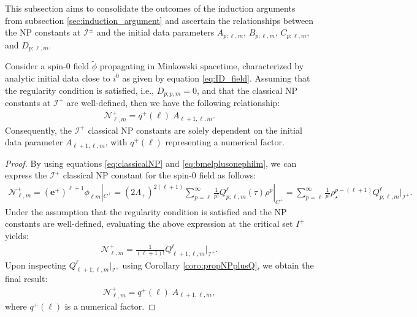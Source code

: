 This subsection aims to consolidate the outcomes of the induction arguments from subsection \ref{sec:induction_argument} and ascertain the relationships between the NP constants at $\mathscr{I}^{\pm}$ and the initial data parameters $A_{p;\ell,m}$, $B_{p;\ell,m}$, $C_{p;\ell,m}$, and $D_{p;\ell,m}$. \\

\begin{proposition}
  Consider a spin-0 field $\tilde{\phi}$ propagating in Minkowski spacetime, characterized by analytic initial data close to $i^0$ as given by equation \eqref{eq:ID_field}. Assuming that the regularity condition is satisfied, i.e., $D_{p;p,m}=0$, and that the classical NP constants at $\mathscr{I}^+$ are well-defined, then we have the following relationship:
   \begin{align}
     \mathcal{N}^{+}_{\ell,m}=q^{+}(\ell) \;A_{\ell+1,\ell,m}.
   \end{align}
   Consequently, the $\mathscr{I}^+$ classical NP constants are solely dependent on the initial data parameter $A_{\ell+1, \ell, m}$, with $q^{+}(\ell)$ representing a numerical factor.
\end{proposition}

\begin{proof}
  By using equations \eqref{eq:classicalNP} and \eqref{eq:bmelplusonephilm}, we can express the $\mathscr{I}^+$ classical NP constant for the spin-0 field as follows:
  \begin{align}
    \mathcal{N}^{+}_{\ell,m} = (\boldsymbol{e}^{+})^{\ell+1}\phi_{\ell m}|_{{C}^{+}} = (2\Lambda_{+})^{2(\ell+1)}\sum_{p=\ell}^{\infty}\frac{1}{p!}Q^{\ell}_{p;\ell,m}(\tau)\rho^{p}|_{{C}^{+}} = \sum_{p=\ell}^{\infty}\frac{1}{p!}\rho_{\star}^{p-(\ell+1)}Q^{\ell}_{p;\ell,m}|_{\mathscr{I}^{+}}.
  \end{align}
  Under the assumption that the regularity condition is satisfied and the NP constants are well-defined, evaluating the above expression at the critical set $I^{+}$ yields:
  \begin{align}
  \mathcal{N}^{+}_{\ell,m} = \frac{1}{(\ell+1)!}Q^{\ell}_{\ell+1;\ell,m}|_{\mathscr{I}^{+}}.
  \end{align}
  Upon inspecting $Q^{\ell}_{\ell+1;\ell,m}|_{\mathscr{I}^{+}}$ using Corollary \ref{coro:propNPplusQ}, we obtain the final result:
  \begin{align}
  \mathcal{N}^{+}_{\ell,m} = q^{+}(\ell) \; A_{\ell+1, \ell,m},
  \end{align}
  where $q^{+}(\ell)$ is a numerical factor.
\end{proof}



